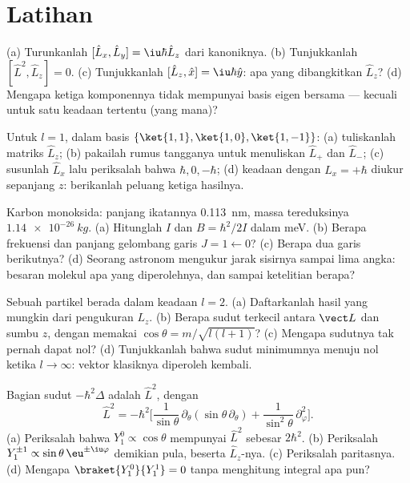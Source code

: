 \section{Latihan}

\begin{exercise}[$\star$]\label{exo:b3:quantum-angular-momentum:1}
(a) Turunkanlah $[\hat L_x, \hat L_y] = \iu\hbar\hat L_z$ dari
 kanoniknya. (b) Tunjukkanlah $[\hat L^2, \hat L_z] = 0$. (c)
Tunjukkanlah $[\hat L_z, \hat x] = \iu\hbar\hat y$: apa yang
dibangkitkan $\hat L_z$? (d) Mengapa ketiga komponennya tidak mempunyai
basis eigen bersama --- kecuali untuk satu keadaan tertentu (yang mana)?
\end{exercise}

\begin{exercise}[$\star$]\label{exo:b3:quantum-angular-momentum:2}
Untuk $l = 1$, dalam basis $\{\ket{1,1}, \ket{1,0}, \ket{1,-1}\}$:
(a) tuliskanlah matriks $\hat L_z$; (b) pakailah rumus tangganya untuk
menuliskan $\hat L_+$ dan $\hat L_-$; (c) susunlah $\hat L_x$ lalu
periksalah bahwa  $\hbar, 0, -\hbar$; (d) keadaan dengan $L_x =
+\hbar$ diukur sepanjang $z$: berikanlah peluang ketiga hasilnya.
\end{exercise}

\begin{exercise}[$\star$]\label{exo:b3:quantum-angular-momentum:3}
Karbon monoksida: panjang ikatannya \qty{0.113}{nm}, massa tereduksinya
$\qty{1.14e-26}{kg}$. (a) Hitunglah $I$ dan $B = \hbar^2/2I$ dalam meV.
(b) Berapa frekuensi dan panjang gelombang garis $J = 1 \leftarrow 0$?
(c) Berapa dua garis berikutnya? (d) Seorang astronom mengukur jarak
sisirnya sampai lima angka: besaran molekul apa yang diperolehnya, dan
sampai ketelitian berapa?
\end{exercise}

\begin{exercise}[$\star$]\label{exo:b3:quantum-angular-momentum:4}
Sebuah partikel berada dalam keadaan $l = 2$. (a) Daftarkanlah hasil
yang mungkin dari pengukuran $L_z$. (b) Berapa sudut terkecil antara
$\vect L$ dan sumbu $z$, dengan memakai $\cos\theta = m/\sqrt{l(l+1)}$?
(c) Mengapa sudutnya tak pernah dapat nol? (d) Tunjukkanlah bahwa sudut
minimumnya menuju nol ketika $l \to \infty$: vektor klasiknya diperoleh
kembali.
\end{exercise}

\begin{exercise}[$\star\star$]\label{exo:b3:quantum-angular-momentum:5}
Bagian sudut $-\hbar^2\Delta$ adalah $\hat L^2$, dengan
\[
\hat L^2 = -\hbar^2\Big[\frac{1}{\sin\theta}\,\partial_\theta
(\sin\theta\,\partial_\theta) +
\frac{1}{\sin^2\theta}\,\partial_\varphi^2\Big] .
\]
(a) Periksalah bahwa $Y_1^0 \propto \cos\theta$ mempunyai 
$\hat L^2$ sebesar $2\hbar^2$. (b) Periksalah $Y_1^{\pm1} \propto \sin\theta\,
\eu^{\pm\iu\varphi}$ demikian pula, beserta  $\hat L_z$-nya.
(c) Periksalah paritasnya. (d) Mengapa $\braket{Y_1^0}{Y_1^1} = 0$ tanpa
menghitung integral apa pun?
\end{exercise}

